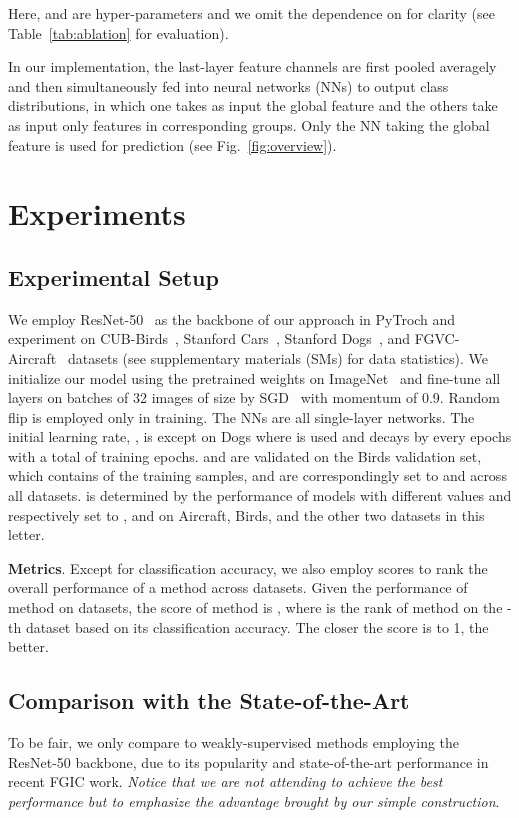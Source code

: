 \documentclass[journal]{IEEEtran}
\begin{document}
Here,  and  are hyper-parameters and we omit the dependence on  for clarity (see Table~\ref{tab:ablation} for evaluation).

In our implementation, the last-layer feature channels are first pooled averagely and then simultaneously fed into  neural networks (NNs) to output class distributions, in which one takes as input the global feature and the others take as input only features in corresponding groups. Only the NN taking the global feature is used for prediction (see Fig.~\ref{fig:overview}). 



\section{Experiments}
\label{sec:exp}


\subsection{Experimental Setup}
\label{sec:setup}
We employ ResNet-50~\cite{resnet16kaiming} as the backbone of our approach in PyTroch and experiment on CUB-Birds~\cite{cubbirds11caltech}, Stanford Cars~\cite{stcars13feifei}, Stanford Dogs~\cite{stdogs11feifei}, and FGVC-Aircraft~\cite{vggaircraft13Vedaldi} datasets (see supplementary materials (SMs) for data statistics). We initialize our model using the pretrained weights on ImageNet~\cite{imagenet@feifei} and fine-tune all layers on batches of 32 images of size  by SGD~\cite{lecun98cnn} with momentum of 0.9. Random flip is employed only in training. The  NNs are all single-layer networks. The initial learning rate, , is  except on Dogs where  is used and decays by  every  epochs with a total of  training epochs.  and  are validated on the Birds validation set, which contains  of the training samples, and are correspondingly set to  and  across all datasets.  is determined by the performance of models with different values and respectively set to , and  on Aircraft, Birds, and the other two datasets in this letter.

\textbf{Metrics}. Except for classification accuracy, we also employ scores to rank the overall performance of a method across datasets. Given the performance of method  on  datasets, the score of method  is , where  is the rank of method  on the -th dataset based on its classification accuracy. The closer the score is to 1, the better.



\subsection{Comparison with the State-of-the-Art}
\label{sec:comparison}
To be fair, we only compare to weakly-supervised methods employing the ResNet-50 backbone, due to its popularity and state-of-the-art performance in recent FGIC work. {\it Notice that we are not attending to achieve the best performance but to emphasize the advantage brought by our simple construction}.
\end{document}
